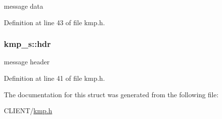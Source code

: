 message data 



Definition at line 43 of file kmp.\-h.

\hypertarget{structkmp__s_a0f268cce5b65a4d47596f9a849332dae}{
\subsubsection[{hdr}]{ kmp\-\_\-s\-::hdr}}\label{structkmp__s_a0f268cce5b65a4d47596f9a849332dae}


message header 



Definition at line 41 of file kmp.\-h.



The documentation for this struct was generated from the following file\-:\begin{DoxyCompactItemize}
\item 
C\-L\-I\-E\-N\-T/\hyperlink{kmp_8h}{kmp.\-h}\end{DoxyCompactItemize}
